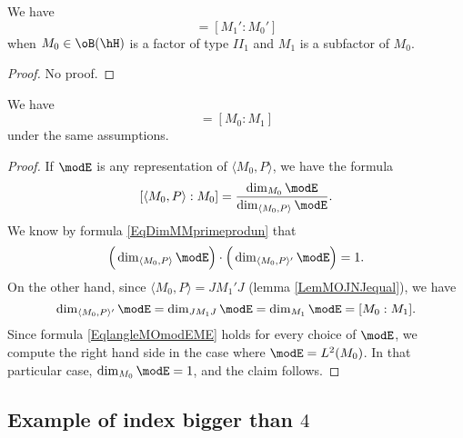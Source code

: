 \begin{corollary}
We have
\begin{equation}
	[M_0:M_1]=[M_1':M_0']
\end{equation}
when $M_0\in\oB(\hH)$ is a factor of type $II_1$ and $M_1$ is a subfactor of $M_0$.
\end{corollary}
\begin{proof}
No proof.
\end{proof}

\begin{theorem}
We have
\begin{equation}
	[ \langle M_0, P\rangle :M_0 ]=[M_0:M_1]
\end{equation}
under the same assumptions.
\end{theorem}

\begin{proof}
If $\modE$ is any representation of $\langle M_0, P\rangle $, we have the formula
\begin{equation}	\label{EqlangleMOmodEME}
	[\langle M_0, P\rangle :M_0]=\frac{ \dim_{M_0}\modE }{ \dim_{\langle M_0, P\rangle }\modE }.
\end{equation}
We know by formula \eqref{EqDimMMprimeprodun} that 
\begin{equation}
	\Big( \dim_{\langle M_0, P\rangle }\modE \Big)\cdot \Big(  \dim_{\langle M_0, P\rangle '}\modE\Big)=1.
\end{equation}
On the other hand, since $\langle M_0, P\rangle =JM_1'J$ (lemma \ref{LemMOJNJequal}), we have
\begin{equation}
	\dim_{\langle M_0, P\rangle '}\modE=\dim_{JM_1J}\modE=\dim_{M_1}\modE=[M_0:M_1].
\end{equation}
Since formula \eqref{EqlangleMOmodEME} holds for every choice of $\modE$, we compute the right hand side in the case where $\modE=L^2(M_0)$. In that particular case, $\dim_{M_0}\modE=1$, and the claim follows.
\end{proof}

					\subsection{Example of index bigger than \texorpdfstring{$4$}{4}}


